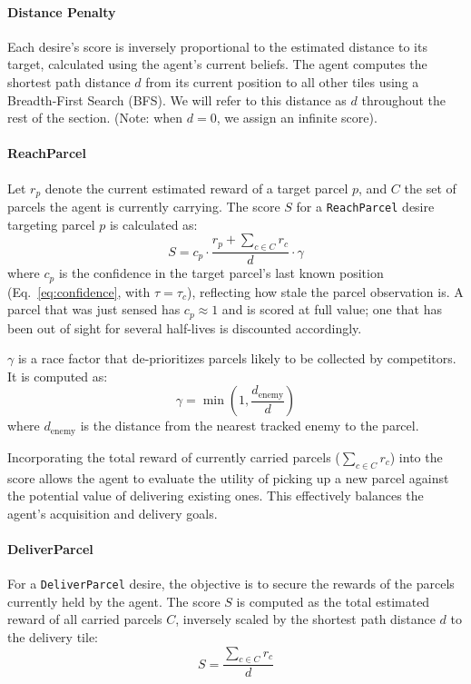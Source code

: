 \paragraph{Distance Penalty}
Each desire's score is inversely proportional to the estimated distance to its target, calculated using the agent's current beliefs.
The agent computes the shortest path distance $d$ from its current position to all other tiles using a Breadth-First Search (BFS).
We will refer to this distance as $d$ throughout the rest of the section. (Note: when $d = 0$, we assign an infinite score).

\paragraph{ReachParcel}
Let $r_p$ denote the current estimated reward of a target parcel $p$, and $C$ the set of parcels the agent is currently carrying.
The score $S$ for a \texttt{ReachParcel} desire targeting parcel $p$ is calculated as:
\begin{equation*}
  S = c_p \cdot \frac{r_p + \sum_{c \in C} r_c}{d} \cdot \gamma
\end{equation*}
where $c_p$ is the confidence in the target parcel's last known position (Eq.~\ref{eq:confidence}, with $\tau = \tau_c$), reflecting how stale the parcel observation is.
A parcel that was just sensed has $c_p \approx 1$ and is scored at full value; one that has been out of sight for several half-lives is discounted accordingly.

$\gamma$ is a race factor that de-prioritizes parcels likely to be collected by competitors. It is computed as:
\[ \gamma = \min\left(1, \frac{d_{\text{enemy}}}{d}\right) \]
where $d_{\text{enemy}}$ is the distance from the nearest tracked enemy to the parcel.

Incorporating the total reward of currently carried parcels ($\sum_{c \in C} r_c$) into the score allows the agent to evaluate the utility of
picking up a new parcel against the potential value of delivering existing ones. This effectively balances the agent's acquisition and delivery goals.

\paragraph{DeliverParcel}
For a \texttt{DeliverParcel} desire, the objective is to secure the rewards of the parcels currently held by the agent. The score $S$ is computed as the total estimated reward of all carried parcels $C$, inversely scaled by the shortest path distance $d$ to the delivery tile:
\begin{equation*}
  S = \frac{\sum_{c \in C} r_c}{d}
\end{equation*}

